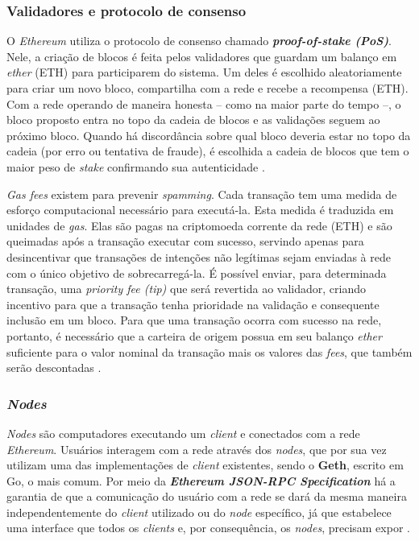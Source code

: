 {\subsubsection{\esp Validadores e protocolo de consenso}
O \textit{Ethereum} utiliza o protocolo de consenso chamado \textbf{\textit{proof-of-stake (PoS)}}. Nele, a criação de blocos é feita pelos validadores que guardam um balanço em \textit{ether} (ETH) para participarem do sistema. Um deles é escolhido aleatoriamente para criar um novo bloco, compartilha com a rede e recebe a recompensa (ETH). Com a rede operando de maneira honesta -- como na maior parte do tempo --, o bloco proposto entra no topo da cadeia de blocos e as validações seguem ao próximo bloco. Quando há discordância sobre qual bloco deveria estar no topo da cadeia (por erro ou tentativa de fraude), é escolhida a cadeia de blocos que tem o maior peso de \textit{stake} confirmando sua autenticidade \cite{ethereumorgconsensus}.

\textit{Gas fees} existem para prevenir \textit{spamming}. Cada transação tem uma medida de esforço computacional necessário para executá-la. Esta medida é traduzida em unidades de \textit{gas}. Elas são pagas na criptomoeda corrente da rede (ETH) e são queimadas após a transação executar com sucesso, servindo apenas para desincentivar que transações de intenções não legítimas sejam enviadas à rede com o único objetivo de sobrecarregá-la. É possível enviar, para determinada transação, uma \textit{priority fee (tip)} que será revertida ao validador, criando incentivo para que a transação tenha prioridade na validação e consequente inclusão em um bloco. Para que uma transação ocorra com sucesso na rede, portanto, é necessário que a carteira de origem possua em seu balanço \textit{ether} suficiente para o valor nominal da transação mais os valores das \textit{fees}, que também serão descontadas \cite{ethereumorggas}.

\subsubsection{\esp \textit{Nodes}}
\textit{Nodes} são computadores executando um \textit{client} e conectados com a rede \textit{Ethereum}. Usuários interagem com a rede através dos \textit{nodes}, que por sua vez utilizam uma das implementações de \textit{client} existentes, sendo o \textbf{Geth}, escrito em Go, o mais comum. Por meio da \textit{\textbf{Ethereum JSON-RPC Specification}} há a garantia de que a comunicação do usuário com a rede se dará da mesma maneira independentemente do \textit{client} utilizado ou do \textit{node} específico, já que estabelece uma interface que todos os \textit{clients} e, por consequência, os \textit{nodes}, precisam expor \cite{ethereumorgnodes}.

}
